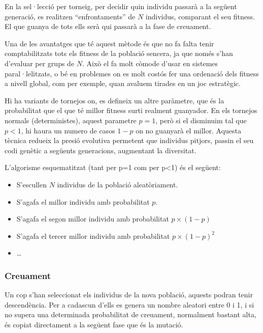 En la sel·lecció per torneig, per decidir quin individu passarà a la següent
generació, es realitzen ``enfrontaments'' de $N$ individus, comparant el seu
fitness.  El que guanya de tots ells serà qui passarà a la fase de creuament.

Una de les avantatges que té aquest mètode és que no fa falta tenir
comptabilitzats tots els fitness de la població sencera, ja que només s'han
d'evaluar per grups de $N$.  Això el fa molt còmode d'usar en sistemes
paral·lelitzats, o bé en problemes on es molt costós fer una ordenació dels
fitness a nivell global, com per exemple, quan avaluem tirades en un joc
estratègic.

Hi ha variants de tornejos on, es defineix un altre paràmetre, que és la
probabilitat que el que té millor fitness surti realment guanyador.  En els
tornejos normals (deterministes), aquest parametre $p=1$, però si el disminuim
tal que $p<1$, hi haura un numero de casos $1-p$ on no guanyarà el millor.
Aquesta tècnica redueix la presió evolutiva permetent que individus pitjors,
passin el seu codi genètic a següents generacions, augmentant la diversitat.

L'algorisme esquematitzat (tant per p=1 com per p<1) és el següent:

\begin{itemize}
	\item S'escullen $N$ individus de la població aleatòriament.
	\item S'agafa el millor individu amb probabilitat $p$.
	\item S'agafa el segon millor individu amb probabilitat $p \times (1-p)$
	\item S'agafa el tercer millor individu amb probabilitat $p \times (1-p)^2$
	\item \ldots
\end{itemize}



\subsubsection{Creuament}

Un cop s'han seleccionat els individus de la nova població, aquests podran tenir
descendència. Per a cadascun d'ells es genera un nombre aleatori entre 0 i 1, i
si no supera una determinada probabilitat de creuament, normalment bastant alta,
és copiat directament a la següent fase que és la mutació.

